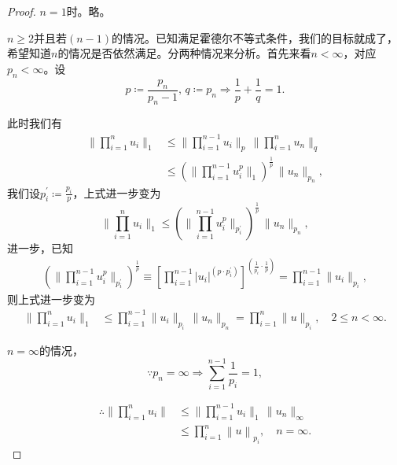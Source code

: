 \begin{proof}
  $n=1$时。略。

  $n \ge 2$并且若$(n-1)$的情况。已知满足霍德尔不等式条件，我们的目标就成了，希望知道$n$的情况是否依然满足。分两种情况来分析。首先来看$n < \infty$，对应$p_n < \infty$。设
  \begin{equation*}
    p \coloneqq \frac{p_n}{p_n -1}, \, q \coloneqq p_n \Rightarrow \frac{1}{p} + \frac{1}{q} = 1.
  \end{equation*}

  此时我们有
  \begin{equation*}
    \begin{split}
      \big\| \prod_{i=1}^{n} u_i \big\|_{1} & \le
      \big\| \prod_{i=1}^{n-1} u_i \big\|_{p} \,
      \big\| \prod_{i=1}^{n} u_n \big\|_{q} \\
      & \le
      \left(
      \big\| \prod_{i=1}^{n-1} u_i^p  \big\|_{1}
      \right)^{\frac{1}{p}} \,
      \big\| u_n \big\|_{p_n},
    \end{split}
  \end{equation*}
我们设$p_i^{'} \coloneqq \frac{p_i}{p}$，上式进一步变为
\begin{equation*}
\big\| \prod_{i=1}^{n} u_i \big\|_{1}  \le
\left(
\big\| \prod_{i=1}^{n-1} u_i^p  \big\|_{p_i^{'}}
\right)^{\frac{1}{p}} \,
\big\| u_n \big\|_{p_n},
\end{equation*}
进一步，已知
\begin{equation*}
  \begin{split}
    \left(
    \big\| \prod_{i=1}^{n-1} u_i^p  \big\|_{p_i^{'}}
    \right)^{\frac{1}{p}} \equiv \left[
    \prod_{i=1}^{n-1} \big| u_i \big|^{\left( p \cdot p_i^{'} \right)}
    \right] ^{\left( \frac{1}{p_i^{'}}  \cdot \frac{1}{p} \right)} =
    \prod_{i=1}^{n-1} \big\| u_i \big\|_{p_i},
  \end{split}
\end{equation*}
则上式进一步变为
\begin{equation*}
  \begin{split}
    \big\| \prod_{i=1}^{n} u_i \big\|_{1} & \le
    \prod_{i=1}^{n-1} \big\| u_i  \big\|_{p_i} \, \big\| u_n \big\|_{p_n} = \prod_{i=1}^{n} \big\| u \big\|_{p_i}, \quad 2 \le n < \infty.
  \end{split}
\end{equation*}

$n = \infty$的情况，
\begin{equation*}
  \because p_n = \infty \Rightarrow \sum_{i=1}^{n-1} \frac{1}{p_i} = 1,
\end{equation*}

\begin{equation*}
  \begin{split}
      \therefore \big\| \prod_{i=1}^{n} u_i \big\| &\le \big\| \prod_{i=1}^{n-1} u_i \big\|_{1} \, \big\| u_n \|_{\infty}\\
      &\le \prod_{i=1}^{n} \left\| u \right\|_{p_i}, \quad n = \infty.
  \end{split}
\end{equation*}
\end{proof}


